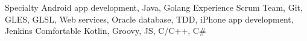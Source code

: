 
\begin{cvskills}
	\cvskill
		{Specialty}
		{Android app development, Java, Golang}
	\cvskill
		{Experience}
		{Scrum Team, Git, GLES, GLSL, Web services, Oracle database, TDD, iPhone app development, Jenkins}
	\cvskill
		{Comfortable}
		{Kotlin, Groovy, JS, C/C++, C\#}
\end{cvskills}

